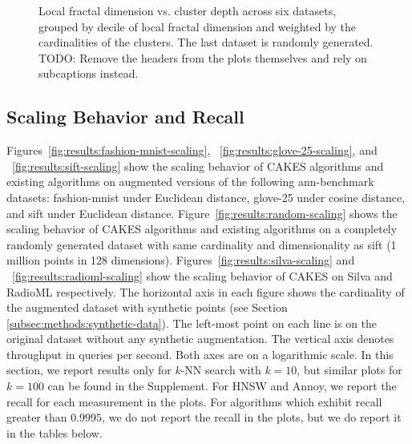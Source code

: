\begin{figure}
\begin{subfigure}[b]{0.47\textwidth}
    \label{fig:results:random-lfd}
    \end{subfigure}
    \vspace{1em}
    \caption{Local fractal dimension vs. cluster depth across six datasets, grouped by decile of local fractal dimension and weighted by the cardinalities of the clusters.
    The last dataset is randomly generated.
    {\color{red} TODO: Remove the headers from the plots themselves and rely on subcaptions instead.}}
    \label{fig:results:lfd-plots}
\end{figure}



\subsection{Scaling Behavior and Recall}
\label{subsec:scaling-behavior-results}

Figures~\ref{fig:results:fashion-mnist-scaling}, ~\ref{fig:results:glove-25-scaling}, and ~\ref{fig:results:sift-scaling} show the scaling behavior of CAKES algorithms and existing algorithms on augmented versions of the following ann-benchmark datasets: fashion-mnist under Euclidean distance, glove-25 under cosine distance, and sift under Euclidean distance.
Figure~\ref{fig:results:random-scaling} shows the scaling behavior of CAKES algorithms and existing algorithms on a completely randomly generated dataset with same cardinality and dimensionality as sift (1 million points in 128 dimensions).
Figures~\ref{fig:results:silva-scaling} and ~\ref{fig:results:radioml-scaling} show the scaling behavior of CAKES on Silva and RadioML respectively.
The horizontal axis in each figure shows the cardinality of the augmented dataset with synthetic points (see Section \ref{subsec:methods:synthetic-data}).
The left-most point on each line is on the original dataset without any synthetic augmentation.
The vertical axis denotes throughput in queries per second.
Both axes are on a logarithmic scale.
In this section, we report results only for $k$-NN search with $k = 10$, but similar plots for $k=100$ can be found in the Supplement.
For HNSW and Annoy, we report the recall for each measurement in the plots. For algorithms which exhibit recall greater than $0.9995$, we do not report the recall in the plots, but we do report it in the tables below.



